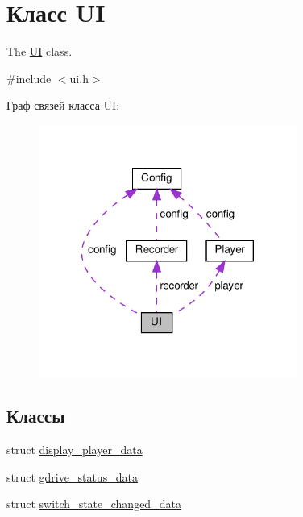 \hypertarget{class_u_i}{}\section{Класс UI}
\label{class_u_i}


The \hyperlink{class_u_i}{UI} class.  




{\ttfamily \#include $<$ui.\+h$>$}



Граф связей класса UI\+:\nopagebreak
\begin{figure}[H]
\begin{center}
\leavevmode
\includegraphics[width=240pt]{class_u_i__coll__graph}
\end{center}
\end{figure}
\subsection*{Классы}
\begin{DoxyCompactItemize}
\item 
struct \hyperlink{struct_u_i_1_1display__player__data}{display\+\_\+player\+\_\+data}
\item 
struct \hyperlink{struct_u_i_1_1gdrive__status__data}{gdrive\+\_\+status\+\_\+data}
\item 
struct \hyperlink{struct_u_i_1_1switch__state__changed__data}{switch\+\_\+state\+\_\+changed\+\_\+data}
\end{DoxyCompactItemize}
